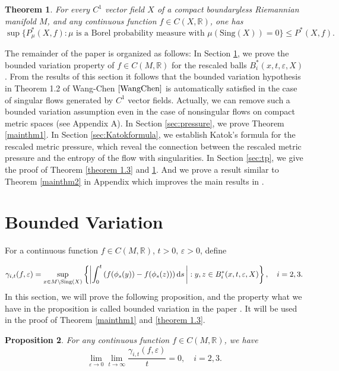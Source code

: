 \documentclass[10pt]{article}
\newtheorem{Theorem}{Theorem}[section]
\newtheorem*{Theorem A}{Theorem A}
\newtheorem{Proposition}[Theorem]{Proposition}
\begin{document}
\begin{Theorem}\label{theorem1.4:vp}
For every \( C^1 \) vector field \( X \) of a compact boundaryless Riemannian manifold $M$, and any continuous function \( f \in C(X, \mathbb{R}) \), one has
\[
\sup\{ {P}_\mu^*(X,f) : \mu \text{ is a Borel probability measure with } \mu(\text{Sing}(X)) = 0 \} \leq {P}^*(X,f).
\]
\end{Theorem}
The remainder of the paper is organized as follows:
In Section \ref{sec:boundedvariation}, we prove the bounded variation property of $f\in C(M, \mathbb{R})$  for the rescaled balls $B_i^*(x, t, \varepsilon, X)$. From the results of this section it follows that the bounded variation hypothesis in Theorem 1.2 of Wang-Chen \(\cite{WangChen}\) is automatically satisfied in the case of singular flows generated by \(C^1\) vector fields. Actually, we can remove such a bounded variation assumption even in the case of nonsingular flows on compact metric spaces (see Appendix A). In Section \ref{sec:pressure}, we prove Theorem \ref{mainthm1}. In Section \ref{sec:Katokformula}, we establish Katok's formula for the rescaled metric pressure, which reveal the connection between the rescaled metric pressure and the entropy of the flow with singularities. In Section \ref{sec:tp}, we give the proof of Theorem \ref{theorem 1.3} and \ref{theorem1.4:vp}. And we prove a result similar to Theorem \ref{mainthm2} in Appendix which improves the main results in \cite{WangChen}.



\section{Bounded Variation}\label{sec:boundedvariation}

For a continuous function \( f \in C(M, \mathbb{R}) \), \(t>0,\,\varepsilon>0\), define

\[
\gamma_{i, t}(f, \varepsilon) = \sup\limits_{x \in M \setminus \text{Sing}(X)}  \left\{ \left| \int_0^t  \left(f(\phi_s(y)) - f(\phi_s(z))\right) {\rm d}s \,\right| : y,z \in B_i^*(x, t,\varepsilon, X) \right\},\quad i=2,3.
\]
In this section, we will prove the following proposition, and the property what we have in the proposition is called bounded variation in the paper \cite{WangChen}. It will be used in the proof of Theorem \ref{mainthm1} and \ref{theorem 1.3}.

\begin{Proposition} \label{boundedvariation}
For any continuous function $f\in C(M, \mathbb{R})$, we have
\[ \lim\limits_{\varepsilon \to 0} \lim\limits_{t \to \infty} \frac{\gamma_{i, t}(f, \varepsilon) }{t} = 0, \quad i = 2, 3. \]

\end{Proposition}
\end{document}
